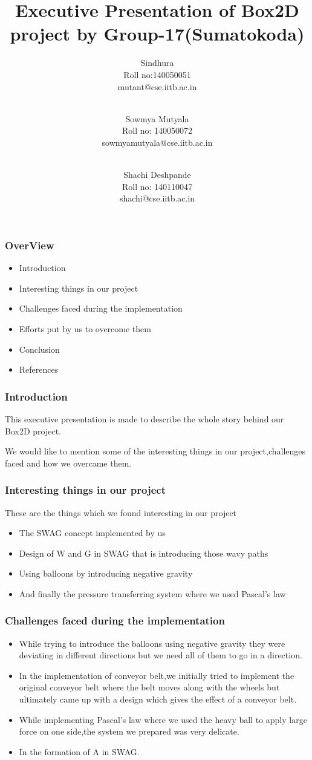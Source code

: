 \documentclass{beamer}
\title{Executive Presentation of Box2D project by Group-17(Sumatokoda)}
\author{
    Sindhura \\
    Roll no:140050051\\
    mutant@cse.iitb.ac.in\\
\and
\\ Sowmya Mutyala\\
    Roll no: 140050072\\
    sowmyamutyala@cse.iitb.ac.in\\
\and
 \\ Shachi Deshpande\\
    Roll no: 140110047\\
    shachi@cse.iitb.ac.in\\
}
\begin{document}
 
\titlepage
 
\begin{frame}
\frametitle{OverView}
\begin{itemize}
\item Introduction
 \item Interesting things in our project
 \item Challenges faced during the implementation
 \item Efforts put by us to overcome them
 \item Conclusion
  \item References
\end{itemize}
\end{frame}


\begin{frame}
 \frametitle{Introduction}

 This executive presentation is made to describe the whole story behind our Box2D project.

 We would like to mention some of the interesting things in our project,challenges faced and how we overcame them.

\end{frame}





\begin{frame}
 \frametitle{Interesting things in our project}
These are the things which we found interesting in our project
 \begin{itemize}
 
 \item The SWAG concept implemented by us
 \item Design of W and G in SWAG that is introducing those wavy paths
 \item Using balloons by introducing negative gravity
 \item And finally the pressure transferring system where we used Pascal's law
\end{itemize}
\end{frame}


\begin{frame}
 \frametitle{Challenges faced during the implementation}
 \begin{itemize}
 \item While trying to introduce the balloons using negative gravity they were deviating in different directions  but we need all of them to go in a direction.
 \item In the implementation of conveyor belt,we initially tried to implement the original conveyor belt where the belt moves along with the wheels but ultimately came up with a design which gives the effect of a conveyor belt.
 \item While implementing Pascal's law where we used the heavy ball to apply large force on one side,the system we prepared was very delicate.
 \item In the formation of A in SWAG.
\end{itemize}
\end{frame}
\end{document}
